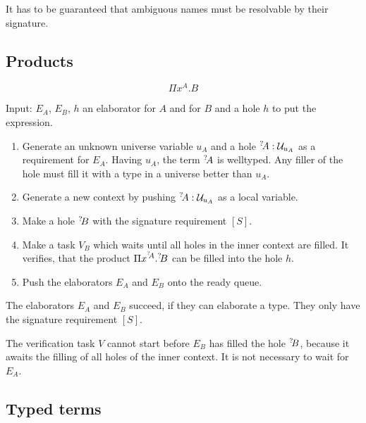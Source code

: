It has to be guaranteed that ambiguous names must be resolvable by their
signature.








\subsection{Products}

$$ \Pi x^A. B $$

Input: $E_A$, $E_B$, $h$ an elaborator for $A$ and for $B$ and a hole $h$ to put
the expression.

\begin{enumerate}
    \item Generate an unknown universe variable $u_A$ and a hole ${{}^? \kern-0.2em A}:
        {\cal U}_{u_A}$ as a requirement for $E_A$. Having $u_A$, the term ${{}^? \kern-0.2em A}$
        is welltyped. Any filler of the hole must fill it with a type in a
        universe better than $u_A$.

    \item Generate a new context by pushing ${{}^? \kern-0.2em A}: {\cal U}_{u_A}$ as a local
        variable.

    \item Make a hole ${{}^? \kern-0.2em B}$ with the signature requirement $[S]$.

    \item Make a task $V_B$ which waits until all holes in the inner context are
        filled. It verifies, that the product $\Pi x^{{{}^? \kern-0.2em A}}. {{}^? \kern-0.2em B}$ can be
        filled into the hole $h$.

    \item Push the elaborators $E_A$ and $E_B$ onto the ready queue.
\end{enumerate}

The elaborators $E_A$ and $E_B$ succeed, if they can elaborate a type. They only
have the signature requirement $[S]$.

The verification task $V$ cannot start before $E_B$ has filled the hole ${{}^? \kern-0.2em B}$, because it awaits the filling of all holes of the inner context. It is not
necessary to wait for $E_A$.








\subsection{Typed terms}

